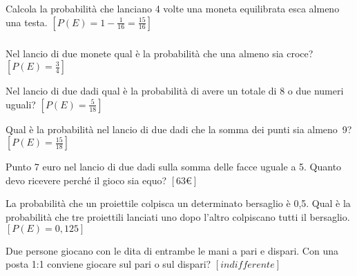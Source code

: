 \begin{esercizio}[\Ast]
 \label{ese:9.46}
Calcola la probabilità che lanciano 4 volte una moneta equilibrata esca almeno 
una testa.
\hfill \(\left[P(E)=1-\frac 1{16}=\frac{15}{16}\right]\)
\end{esercizio}

\subsubsection*{}

\begin{esercizio}[\Ast]
 \label{ese:9.47}
Nel lancio di due monete qual è la probabilità che una almeno sia croce?
\hfill \(\left[P(E)=\frac 3 4\right]\)
\end{esercizio}

\begin{esercizio}[\Ast]
 \label{ese:9.48}
Nel lancio di due dadi qual è la probabilità di avere un totale di 8 o due 
numeri uguali?
\hfill \(\left[P(E)=\frac 5{18}\right]\)
\end{esercizio}

\begin{esercizio}[\Ast]
 \label{ese:9.49}
Qual è la probabilità nel lancio di due dadi che la somma dei punti sia 
almeno~9?
\hfill \(\left[P(E)=\frac{15}{18}\right]\)
\end{esercizio}

\begin{esercizio}[\Ast]
 \label{ese:9.50}
Punto 7 euro nel lancio di due dadi sulla somma delle facce uguale a 5. Quanto 
devo ricevere perché il gioco sia equo?
\hfill \(\left[63\text{€}\right]\)
\end{esercizio}

\begin{esercizio}[\Ast]
 \label{ese:9.51}
La probabilità che un proiettile colpisca un determinato bersaglio è 0,5. Qual è 
la probabilità che tre proiettili lanciati uno dopo l'altro colpiscano tutti il 
bersaglio.
\hfill \(\left[P(E)=0,125\right]\)
\end{esercizio}

\begin{esercizio}[\Ast]
 \label{ese:9.52}
Due persone giocano con le dita di entrambe le mani a pari e dispari. Con una 
posta 1:1 conviene giocare sul pari o sul dispari?
\hfill \(\left[indifferente\right]\)
\end{esercizio}

